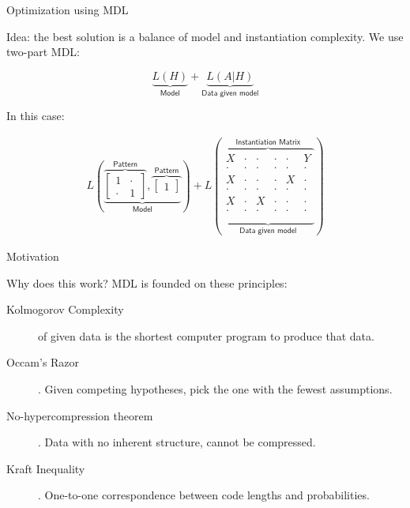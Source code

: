 \documentclass[11pt]{beamer}
\begin{document}
\begin{frame}{Optimization using MDL}

Idea: the best solution is a balance of model and instantiation complexity. We use two-part MDL:

$$
\underbrace{L(H)}_{\textsf{Model}} + \underbrace{L(A|H)}_{\textsf{Data given model}}
$$

In this case:

\begin{align*}
L\left(
\underbrace{
\overbrace{
\begin{bmatrix}
1 & \cdot \\[-.2em]
\cdot & 1
\end{bmatrix}}^{\textsf{Pattern}},
\overbrace{
\begin{bmatrix}
1
\end{bmatrix}}^{\textsf{Pattern}}
}_{\textsf{Model}}
\right)
+
L\left(
\underbrace{ 
\overbrace{
\begin{matrix}
X & \cdot & \cdot & \cdot & \cdot & Y  \\[-.2em]
\cdot & \cdot & \cdot & \cdot & \cdot & \cdot  \\[-.2em]
X & \cdot & \cdot & \cdot & X & \cdot  \\[-.2em]
\cdot & \cdot & \cdot & \cdot & \cdot & \cdot  \\[-.2em]
X & \cdot & X & \cdot & \cdot & \cdot  \\[-.2em]
\cdot & \cdot & \cdot & \cdot & \cdot & \cdot  \\
\end{matrix}}}^{\textsf{Instantiation Matrix}}_{\textsf{Data given model}}
\right)
\end{align*}
\end{frame}


\begin{frame}{Motivation}

Why does this work? MDL is founded on these principles:\\[1em]
\begin{description}
\item[Kolmogorov Complexity] of given data is the shortest computer program to produce that data.
\item[Occam's Razor]. Given competing hypotheses, pick the one with the fewest assumptions.
\item[No-hypercompression theorem]. Data with no inherent structure, cannot be compressed.
\item[Kraft Inequality]. One-to-one correspondence between code lengths and probabilities.
\end{description}

\end{frame}
\end{document}
